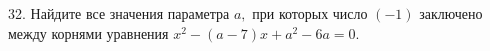 32. Найдите все значения параметра $a,$ при которых число $(-1)$ заключено между корнями уравнения $x^2-(a-7)x+a^2-6a=0.$\\
